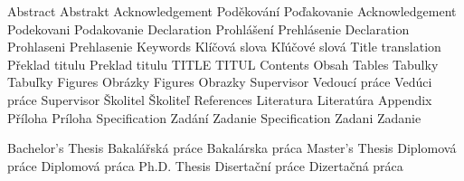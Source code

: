      {Abstract}          {Abstrakt}       {}
       {Acknowledgement}   {Poděkování}     {Poďakovanie} 
      {Acknowledgement}   {Podekovani}     {Podakovanie} 
  {Declaration}       {Prohlášení}     {Prehlásenie} 
 {Declaration}       {Prohlaseni}     {Prehlasenie}
     {Keywords}          {Klíčová slova}  {Kľúčové slová}
        {Title translation} {Překlad titulu} {Preklad titulu}
       {TITLE}             {TITUL}          {}
     {Contents}          {Obsah}          {}
       {Tables}            {Tabulky}        {Tabuľky}
      {Figures}           {Obrázky}        {}
     {Figures}           {Obrazky}        {}
   {Supervisor}        {Vedoucí práce}  {Vedúci práce}
  {Supervisor}        {Školitel}       {Školiteľ}
 {References}        {Literatura}     {Literatúra}
     {Appendix}          {Příloha}        {Príloha}     
      {Specification}     {Zadání}         {Zadanie}
     {Specification}     {Zadani}         {Zadanie}

 {Bachelor's Thesis} {Bakalářská práce}  {Bakalárska práca}
 {Master's Thesis}   {Diplomová práce}   {Diplomová práca}
 {Ph.D. Thesis}      {Disertační práce}  {Dizertačná práca}

\def\keepacc#1{\slet{mt:#10:sk}{mt:#1:sk}\slet{mt:#10:\czs}{mt:#1:\czs}}
\def\keepaccents{\keepacc{thanks}%
  \keepacc{declaration}\keepacc{figures}\keepacc{specifi}}



\def\worktype[#1/#2]{%
   \isdefined{wt:#1}\iftrue \csname wt:#1\endcsname \relax
      \else \ctustyleERR {Unknown \noexpand\worktype parameter}\fi
   \isdefined{wl:#2}\iftrue \csname wl:#2\endcsname \relax
      \else \ctustyleERR {Unknown \noexpand\worktype parameter}\fi
}




\ifx\font\corkencoded 
\fi

